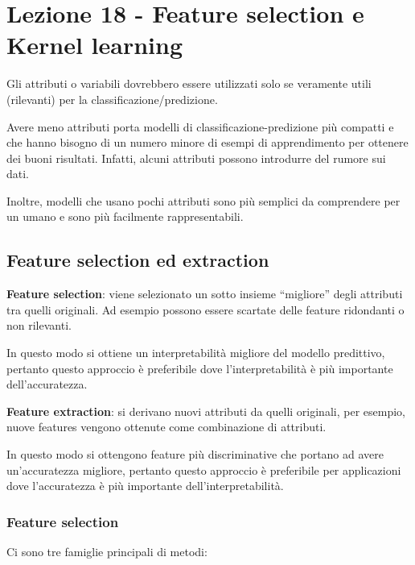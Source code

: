 \section{Lezione 18 - Feature selection e Kernel learning}\label{lezione-18---feature-selection-e-kernel-learning}

Gli attributi o variabili dovrebbero essere utilizzati solo se veramente
utili (rilevanti) per la classificazione/predizione.

Avere meno attributi porta modelli di classificazione-predizione più
compatti e che hanno bisogno di un numero minore di esempi di
apprendimento per ottenere dei buoni risultati. Infatti, alcuni
attributi possono introdurre del rumore sui dati.

Inoltre, modelli che usano pochi attributi sono più semplici da
comprendere per un umano e sono più facilmente rappresentabili.

\subsection{Feature selection ed extraction}\label{feature-selection-ed-extraction}

\textbf{Feature selection}: viene selezionato un sotto insieme
``migliore'' degli attributi tra quelli originali. Ad esempio possono
essere scartate delle feature ridondanti o non rilevanti.

In questo modo si ottiene un interpretabilità migliore del modello
predittivo, pertanto questo approccio è preferibile dove
l'interpretabilità è più importante dell'accuratezza.

\textbf{Feature extraction}: si derivano nuovi attributi da quelli
originali, per esempio, nuove features vengono ottenute come
combinazione di attributi.

In questo modo si ottengono feature più discriminative che portano ad
avere un'accuratezza migliore, pertanto questo approccio è preferibile
per applicazioni dove l'accuratezza è più importante
dell'interpretabilità.

\subsubsection{Feature selection}\label{feature-selection}

Ci sono tre famiglie principali di metodi:

